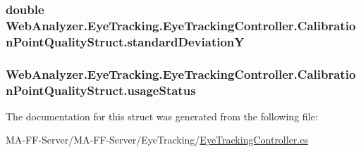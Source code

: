 \subsubsection[{standard\+Deviation\+Y}]{\setlength{\rightskip}{0pt plus 5cm}double Web\+Analyzer.\+Eye\+Tracking.\+Eye\+Tracking\+Controller.\+Calibration\+Point\+Quality\+Struct.\+standard\+Deviation\+Y}\label{struct_web_analyzer_1_1_eye_tracking_1_1_eye_tracking_controller_1_1_calibration_point_quality_struct_adbbdae545c730e536f4d4181eb50ec80}
\hypertarget{struct_web_analyzer_1_1_eye_tracking_1_1_eye_tracking_controller_1_1_calibration_point_quality_struct_a641387e14a3980cded3236d43e5b375d}{}
\subsubsection[{usage\+Status}]{ Web\+Analyzer.\+Eye\+Tracking.\+Eye\+Tracking\+Controller.\+Calibration\+Point\+Quality\+Struct.\+usage\+Status}\label{struct_web_analyzer_1_1_eye_tracking_1_1_eye_tracking_controller_1_1_calibration_point_quality_struct_a641387e14a3980cded3236d43e5b375d}


The documentation for this struct was generated from the following file\+:\begin{DoxyCompactItemize}
\item 
M\+A-\/\+F\+F-\/\+Server/\+M\+A-\/\+F\+F-\/\+Server/\+Eye\+Tracking/\hyperlink{_eye_tracking_controller_8cs}{Eye\+Tracking\+Controller.\+cs}\end{DoxyCompactItemize}
